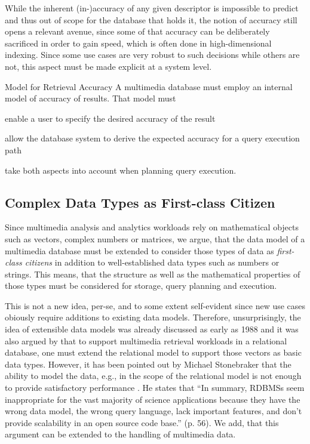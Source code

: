 While the inherent (in-)accuracy of any given descriptor is impossible to predict and thus out of scope for the database that holds it, the notion of accuracy still opens a relevant avenue, since some of that accuracy can be deliberately sacrificed in order to gain speed, which is often done in high-dimensional indexing. Since some use cases are very robust to such decisions while others are not, this aspect must be made explicit at a system level.

\begin{requirement}[label=requirement:accuracy_model]{Model for Retrieval Accuracy}{}
    A multimedia database must employ an internal model of accuracy of results. That model must
    \begin{enumerate*}[label=(\roman*)]
        \item enable a user to specify the desired accuracy of the result
        \item allow the database system to derive the expected accuracy for a query execution path
        \item take both aspects into account when planning query execution.
    \end{enumerate*}
\end{requirement}

\subsection{Complex Data Types as First-class Citizen}
Since multimedia analysis and analytics workloads rely on mathematical objects such as vectors, complex numbers or matrices, we argue, that the data model of a multimedia database must be extended to consider those types of data as \emph{first-class citizens} in addition to well-established data types such as numbers or strings. This means, that the structure as well as the mathematical properties of those types must be considered for storage, query planning and execution.

This is not a new idea, per-se, and to some extent self-evident since new use cases obiously require additions to existing data models. Therefore, unsurprisingly, the idea of extensible data models was already discussed as early as 1988 \cite{Linnemann:1988Design} and it was also argued by \cite{Giangreco:2018Database} that to support multimedia retrieval workloads in a relational database, one must extend the relational model to support those vectors as basic data types. However, it has been pointed out by Michael Stonebraker that the ability to model the data, e.g., in the scope of the relational model is not enough to provide satisfactory performance \cite{Stonebraker:2013SciDB}. He states that ``In summary, RDBMSs seem inappropriate for the vast majority of science applications because they have the wrong data model, the wrong query language, lack important features, and don't provide scalability in an open source code base.'' \cite{Stonebraker:2013SciDB} (p. 56). We add, that this argument can be extended to the handling of multimedia data.

